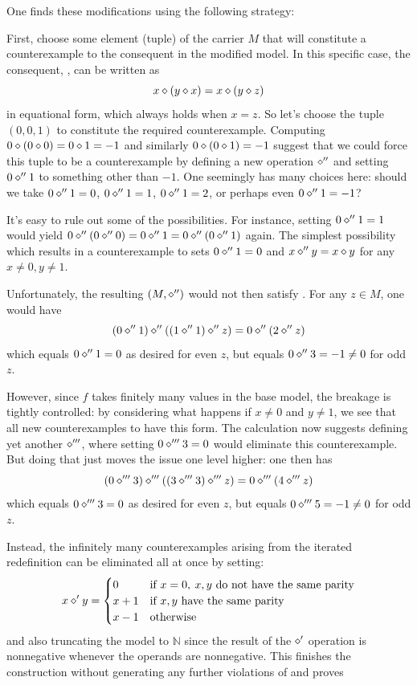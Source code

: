 One finds these modifications using the following strategy:

First, choose some element (tuple) of the carrier $M$ that will constitute a counterexample to the
consequent in the modified model. In this specific case, the consequent, , can be written as
$$ x \diamond (y \diamond x) = x \diamond (y \diamond z)$$
in equational form, which always holds when $x = z$. So let's choose the tuple $(0,0,1)$
to constitute the required counterexample. Computing $0 \diamond (0 \diamond 0) = 0 \diamond 1 = -1$ and similarly
$0 \diamond (0 \diamond 1) = -1$ suggest that we could force this tuple to be a counterexample by defining a new
operation $\diamond''$ and setting
$0 \diamond'' 1$ to something other than $-1$. One seemingly has many choices here: should we take
$0 \diamond'' 1 =0$, $0 \diamond'' 1 = 1$, $0 \diamond'' 1 = 2$, or perhaps even $0 \diamond'' 1 = -1$?

It's easy to rule out some of the possibilities. For instance, setting $0 \diamond'' 1 = 1$ would
yield $0 \diamond'' (0 \diamond'' 0) = 0 \diamond'' 1 = 0 \diamond'' (0 \diamond'' 1)$ again. The simplest possibility which results in
a counterexample to  sets $0 \diamond'' 1 = 0$ and $x \diamond'' y = x \diamond y$ for any $x \neq 0, y \neq 1$.

Unfortunately, the resulting $(M,\diamond'')$ would not then satisfy . For any $z \in M$, one would have
$$ (0 \diamond'' 1) \diamond'' ((1 \diamond'' 1) \diamond'' z) = 0 \diamond'' (2 \diamond'' z)$$
which equals $0 \diamond'' 1 = 0$ as desired for even $z$, but equals $0 \diamond'' 3 = -1 \neq 0$ for odd $z$.

However, since $f$ takes finitely many values in the base model, the breakage is tightly controlled:
by considering what happens if $x \neq 0$ and $y \neq 1$, we see that all new counterexamples to 
have this form. The calculation now suggests defining yet another $\diamond'''$, where setting
$0 \diamond''' 3 = 0$ would eliminate
this counterexample. But doing that just moves the issue one level higher: one then has
$$ (0 \diamond''' 3) \diamond''' ((3 \diamond''' 3) \diamond''' z) = 0 \diamond''' (4 \diamond''' z)$$ which equals $0 \diamond''' 3 = 0$ as desired for even $z$, but equals $0 \diamond''' 5 = -1 \neq 0$ for odd $z$.

Instead, the infinitely many counterexamples arising from the iterated redefinition can be eliminated
all at once by setting:
$$x \diamond' y = \begin{cases} 0 & \text{if } x=0,\: x,y \text{ do not have the same parity} \\  x+1 & \text{if } x,y \text{ have the same parity} \\ x -1 & \text{otherwise} \end{cases}$$
and also truncating the model to $\mathbb{N}$ since the result of the $\diamond'$
operation is nonnegative whenever the operands are nonnegative. This finishes the construction without generating any further violations of  and proves

